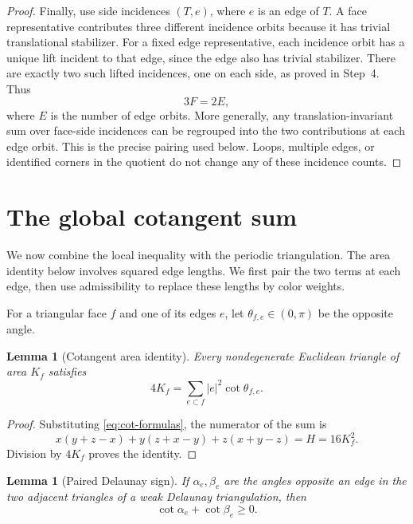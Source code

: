 \documentclass[11pt,a4paper]{article}
\newtheorem{lemma}[theorem]{Lemma}
\theoremstyle{definition}
\theoremstyle{remark}
\begin{document}
\begin{proof}
Finally, use side incidences $(T,e)$, where $e$ is an edge of $T$.
A face representative contributes three different incidence orbits
because it has trivial translational stabilizer. For a fixed edge
representative, each incidence orbit has a unique lift incident to
that edge, since the edge also has trivial stabilizer. There are
exactly two such lifted incidences, one on each side, as proved in
Step~4. Thus
\[
3F=2E,
\]
where $E$ is the number of edge orbits. More generally, any
translation-invariant sum over face-side incidences can be regrouped
into the two contributions at each edge orbit. This is the precise
pairing used below. Loops, multiple edges, or identified corners in the
quotient do not change any of these incidence counts.
\end{proof}

\section{The global cotangent sum}
\label{sec:global}

We now combine the local inequality with the periodic triangulation.
The area identity below involves squared edge lengths. We first pair
the two terms at each edge, then use admissibility to replace these
lengths by color weights.

For a triangular face $f$ and one of its edges $e$, let
$\theta_{f,e}\in(0,\pi)$ be the opposite angle.

\begin{lemma}[Cotangent area identity]
\label{lem:area-identity}
Every nondegenerate Euclidean triangle of area $K_f$ satisfies
\begin{equation}
\label{eq:area-identity}
4K_f=\sum_{e\subset f}|e|^2\cot\theta_{f,e}.
\end{equation}
\end{lemma}

\begin{proof}
Substituting \eqref{eq:cot-formulas}, the numerator of the sum is
\[
x(y+z-x)+y(z+x-y)+z(x+y-z)=H=16K_f^2.
\]
Division by $4K_f$ proves the identity.
\end{proof}

\begin{lemma}[Paired Delaunay sign]
\label{lem:paired-sign}
If $\alpha_e,\beta_e$ are the angles opposite an edge in the two adjacent
triangles of a weak Delaunay triangulation, then
\begin{equation}
\label{eq:paired-sign}
\cot\alpha_e+\cot\beta_e\geq0.
\end{equation}
\end{lemma}
\end{document}
